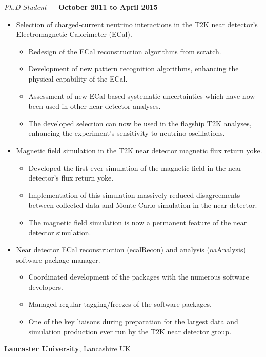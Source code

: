\documentclass[margin,line]{res}
\begin{document}
\begin{resume}
\vspace{-.3cm}
{\em Ph.D Student} --- {\bf October 2011 to April 2015}%
\begin{itemize}
\item Selection of charged-current neutrino interactions in the T2K near detector's Electromagnetic Calorimeter (ECal).
\begin{itemize}
\item Redesign of the ECal reconstruction algorithms from scratch.
\item Development of new pattern recognition algorithms, enhancing the physical capability of the ECal.
\item Assessment of new ECal-based systematic uncertainties which have now been used in other near detector analyses.
\item The developed selection can now be used in the flagship T2K analyses, enhancing the experiment's sensitivity to neutrino oscillations.
\end{itemize}
\item Magnetic field simulation in the T2K near detector magnetic flux return yoke.
\begin{itemize}
\item Developed the first ever simulation of the magnetic field in the near detector's flux return yoke.
\item Implementation of this simulation massively reduced disagreements between collected data and Monte Carlo simulation in the near detector.
\item The magnetic field simulation is now a permanent feature of the near detector simulation.
\end{itemize}
\item Near detector ECal reconstruction (ecalRecon) and analysis (oaAnalysis) software package manager.
\begin{itemize}
\item Coordinated development of the packages with the numerous software developers.
\item Managed regular tagging/freezes of the software packages.
\item One of the key liaisons during preparation for the largest data and simulation production ever run by the T2K near detector group.
\end{itemize}
\end{itemize}

{\bf Lancaster University}, Lancashire UK


\end{resume}
\end{document}
